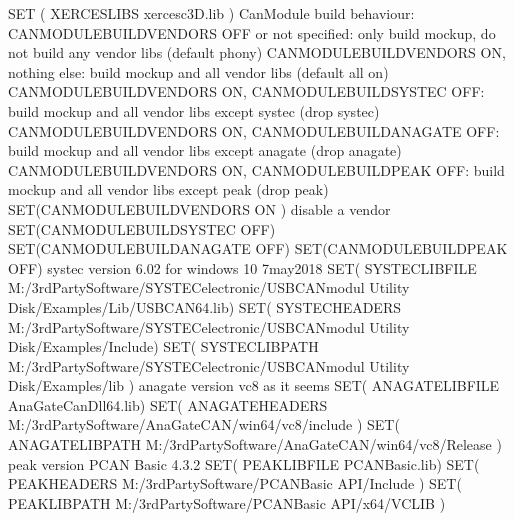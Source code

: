 \documentclass[letterpaper,10pt,english]{sphinxmanual}
\begin{document}
\begin{sphinxVerbatim}[commandchars=\\\{\}]
SET ( XERCES\PYGZus{}LIBS \PYGZdq{}xerces\PYGZhy{}c\PYGZus{}3D.lib\PYGZdq{} )
\PYGZsh{}
\PYGZsh{} CanModule build behaviour:
\PYGZsh{} CANMODULE\PYGZus{}BUILD\PYGZus{}VENDORS OFF or not specified: only build mockup, do not build any vendor libs (default phony)
\PYGZsh{} CANMODULE\PYGZus{}BUILD\PYGZus{}VENDORS ON, nothing else: build mockup and all vendor libs (default all on)
\PYGZsh{} CANMODULE\PYGZus{}BUILD\PYGZus{}VENDORS ON, CANMODULE\PYGZus{}BUILD\PYGZus{}SYSTEC OFF: build mockup and all vendor libs except systec (drop systec)
\PYGZsh{} CANMODULE\PYGZus{}BUILD\PYGZus{}VENDORS ON, CANMODULE\PYGZus{}BUILD\PYGZus{}ANAGATE OFF: build mockup and all vendor libs except anagate (drop anagate)
\PYGZsh{} CANMODULE\PYGZus{}BUILD\PYGZus{}VENDORS ON, CANMODULE\PYGZus{}BUILD\PYGZus{}PEAK OFF: build mockup and all vendor libs except peak (drop peak)
SET(CANMODULE\PYGZus{}BUILD\PYGZus{}VENDORS \PYGZdq{}ON\PYGZdq{} )
\PYGZsh{} disable a vendor
\PYGZsh{}SET(CANMODULE\PYGZus{}BUILD\PYGZus{}SYSTEC \PYGZdq{}OFF\PYGZdq{})
\PYGZsh{}SET(CANMODULE\PYGZus{}BUILD\PYGZus{}ANAGATE \PYGZdq{}OFF\PYGZdq{})
\PYGZsh{}SET(CANMODULE\PYGZus{}BUILD\PYGZus{}PEAK \PYGZdq{}OFF\PYGZdq{})
\PYGZsh{}
\PYGZsh{} systec
\PYGZsh{} version 6.02 for windows 10 7may2018
SET( SYSTEC\PYGZus{}LIB\PYGZus{}FILE \PYGZdq{}M:/3rdPartySoftware/SYSTEC\PYGZhy{}electronic/USB\PYGZhy{}CANmodul Utility Disk/Examples/Lib/USBCAN64.lib\PYGZdq{})
SET( SYSTEC\PYGZus{}HEADERS \PYGZdq{}M:/3rdPartySoftware/SYSTEC\PYGZhy{}electronic/USB\PYGZhy{}CANmodul Utility Disk/Examples/Include\PYGZdq{})
SET( SYSTEC\PYGZus{}LIB\PYGZus{}PATH \PYGZdq{}M:/3rdPartySoftware/SYSTEC\PYGZhy{}electronic/USB\PYGZhy{}CANmodul Utility Disk/Examples/lib\PYGZdq{} )
\PYGZsh{}
\PYGZsh{} anagate
\PYGZsh{} version vc8 as it seems
SET( ANAGATE\PYGZus{}LIB\PYGZus{}FILE \PYGZdq{}AnaGateCanDll64.lib\PYGZdq{})
SET( ANAGATE\PYGZus{}HEADERS \PYGZdq{}M:/3rdPartySoftware/AnaGateCAN/win64/vc8/include\PYGZdq{} )
SET( ANAGATE\PYGZus{}LIB\PYGZus{}PATH \PYGZdq{}M:/3rdPartySoftware/AnaGateCAN/win64/vc8/Release\PYGZdq{} )
\PYGZsh{}
\PYGZsh{} peak
\PYGZsh{} version PCAN Basic 4.3.2
SET( PEAK\PYGZus{}LIB\PYGZus{}FILE \PYGZdq{}PCANBasic.lib\PYGZdq{})
SET( PEAK\PYGZus{}HEADERS \PYGZdq{}M:/3rdPartySoftware/PCAN\PYGZhy{}Basic API/Include\PYGZdq{} )
SET( PEAK\PYGZus{}LIB\PYGZus{}PATH \PYGZdq{}M:/3rdPartySoftware/PCAN\PYGZhy{}Basic API/x64/VC\PYGZus{}LIB\PYGZdq{} )
\end{sphinxVerbatim}

\end{document}
